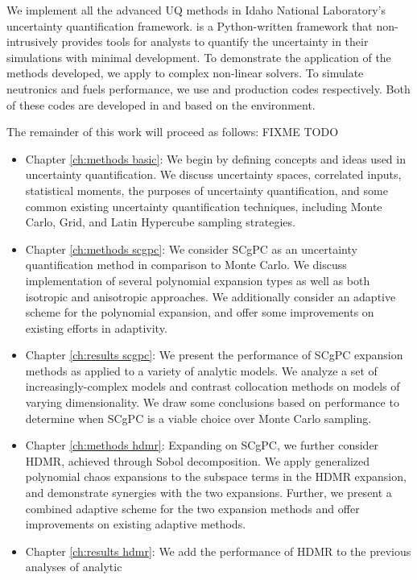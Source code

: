 We implement all the advanced UQ methods in Idaho National Laboratory's \raven{} \cite{raven}
uncertainty quantification framework. \raven{} is a Python-written framework that non-intrusively provides
tools for analysts to quantify the uncertainty in their simulations with minimal development.  To demonstrate
the application of the methods developed, we apply \raven{} to complex non-linear solvers.
To simulate neutronics and fuels performance, we use \rattlesnake{} \cite{rattlesnake} and 
\bison{} \cite{bison,mammoth} production codes respectively.
Both of these codes are developed in and based on the \moose{} \cite{moose} environment.

The remainder of this work will proceed as follows:
FIXME TODO
\begin{itemize}
  \item Chapter \ref{ch:methods basic}: We begin by defining concepts and ideas used in uncertainty
    quantification.  We discuss uncertainty spaces, correlated inputs, statistical moments, the purposes of
    uncertainty quantification, and some common existing uncertainty quantification techniques, including
    Monte Carlo, Grid, and Latin Hypercube sampling strategies.
  \item Chapter \ref{ch:methods scgpc}: We consider SCgPC as an uncertainty
    quantification method in comparison to Monte Carlo.  We discuss implementation of several polynomial
    expansion types as well as both isotropic and anisotropic approaches.  We additionally consider an
    adaptive scheme for the polynomial expansion, and offer some improvements on existing efforts in
    adaptivity.
  \item Chapter \ref{ch:results scgpc}: We present the performance of SCgPC
    expansion methods as applied to a variety of analytic models.  We analyze a set of increasingly-complex
    models and contrast collocation methods on models of varying dimensionality.  We draw some conclusions
    based on performance to determine when SCgPC is a viable choice over Monte Carlo sampling.
  \item Chapter \ref{ch:methods hdmr}: Expanding on SCgPC, we further consider
    HDMR, achieved through Sobol decomposition.  We apply generalized polynomial
    chaos expansions to the subspace terms in the HDMR expansion, and demonstrate
    synergies with the two expansions.  Further, we present a combined adaptive scheme for the two expansion
    methods and offer improvements on existing adaptive methods.
  \item Chapter \ref{ch:results hdmr}: We add the performance of HDMR to the previous analyses of analytic

\end{itemize}
